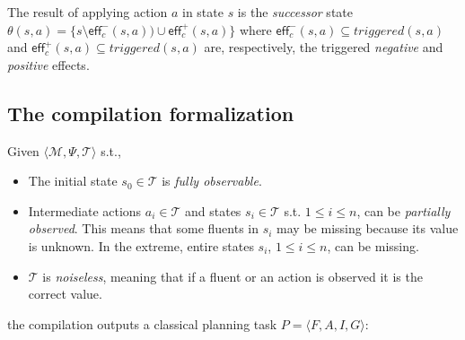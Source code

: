 \documentclass[letterpaper]{article} %
\newcommand{\tup}[1]{{\langle #1 \rangle}}
\newcommand{\eff}{\mathsf{eff}}     %
\begin{document}
The result of applying action $a$ in state $s$ is the {\em successor} state $\theta(s,a)=\{s\setminus\eff_c^-(s,a))\cup\eff_c^+(s,a)\}$ where $\eff_c^-(s,a)\subseteq triggered(s,a)$ and $\eff_c^+(s,a)\subseteq triggered(s,a)$ are, respectively, the triggered {\em negative} and {\em positive} effects.


\subsection{The compilation formalization}

Given $\tup{\mathcal{M},\Psi,\mathcal{T}}$ s.t.,
\begin{itemize}
\item The initial state $s_0\in\mathcal{T}$ is {\em fully observable}.
\item Intermediate actions $a_i\in\mathcal{T}$ and states $s_i\in\mathcal{T}$ s.t. {\small $1\leq i\leq n$}, can be {\em partially observed}. This means that some fluents in $s_i$ may be missing because its value is unknown. In the extreme, entire states $s_i$, {\small $1\leq i\leq n$}, can be missing. 
\item $\mathcal{T}$ is {\em noiseless}, meaning that if a fluent or an action is observed it is the correct value. 
\end{itemize}
the compilation outputs a classical planning task $P=\tup{F,A,I,G}$:
\end{document}
